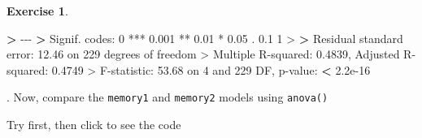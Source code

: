 \documentclass[
]{book}
\newenvironment{Shaded}{\begin{snugshade}}{\end{snugshade}}
\newcommand{\DecValTok}[1]{\textcolor[rgb]{0.00,0.00,0.81}{#1}}
\newcommand{\ErrorTok}[1]{\textcolor[rgb]{0.64,0.00,0.00}{\textbf{#1}}}
\newcommand{\FloatTok}[1]{\textcolor[rgb]{0.00,0.00,0.81}{#1}}
\newcommand{\NormalTok}[1]{#1}
\newcommand{\SpecialCharTok}[1]{\textcolor[rgb]{0.00,0.00,0.00}{#1}}
\newcommand{\StringTok}[1]{\textcolor[rgb]{0.31,0.60,0.02}{#1}}
\theoremstyle{definition}
\theoremstyle{definition}
\theoremstyle{definition}
\newtheorem{exercise}{Exercise}[chapter]
\theoremstyle{definition}
\theoremstyle{remark}
\begin{document}
\begin{exercise}
\begin{Shaded}
\begin{Highlighting}[]
\ErrorTok{\textgreater{}} \SpecialCharTok{{-}{-}{-}}
\ErrorTok{\textgreater{}}\NormalTok{ Signif. codes}\SpecialCharTok{:}  \DecValTok{0} \StringTok{\textquotesingle{}***\textquotesingle{}} \FloatTok{0.001} \StringTok{\textquotesingle{}**\textquotesingle{}} \FloatTok{0.01} \StringTok{\textquotesingle{}*\textquotesingle{}} \FloatTok{0.05} \StringTok{\textquotesingle{}.\textquotesingle{}} \FloatTok{0.1} \StringTok{\textquotesingle{} \textquotesingle{}} \DecValTok{1}
\SpecialCharTok{\textgreater{}} 
\ErrorTok{\textgreater{}}\NormalTok{ Residual standard error}\SpecialCharTok{:} \FloatTok{12.46}\NormalTok{ on }\DecValTok{229}\NormalTok{ degrees of freedom}
\SpecialCharTok{\textgreater{}}\NormalTok{ Multiple R}\SpecialCharTok{{-}}\NormalTok{squared}\SpecialCharTok{:}  \FloatTok{0.4839}\NormalTok{,  Adjusted R}\SpecialCharTok{{-}}\NormalTok{squared}\SpecialCharTok{:}  \FloatTok{0.4749} 
\SpecialCharTok{\textgreater{}}\NormalTok{ F}\SpecialCharTok{{-}}\NormalTok{statistic}\SpecialCharTok{:} \FloatTok{53.68}\NormalTok{ on }\DecValTok{4}\NormalTok{ and }\DecValTok{229}\NormalTok{ DF,  p}\SpecialCharTok{{-}}\NormalTok{value}\SpecialCharTok{:} \ErrorTok{\textless{}} \FloatTok{2.2e{-}16}
\end{Highlighting}
\end{Shaded}

\hfill{}. Now, compare the \texttt{memory1} and \texttt{memory2} models using \texttt{anova()}

Try first, then click to see the code


\end{exercise}
\end{document}
